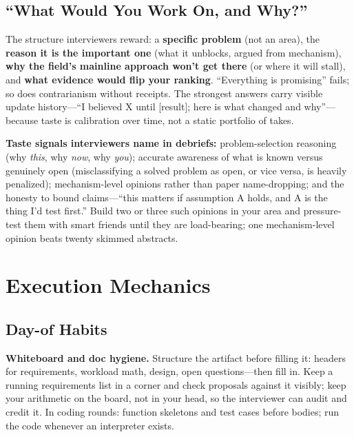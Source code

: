 \subsection{``What Would You Work On, and Why?''}

The structure interviewers reward: a \textbf{specific problem} (not an area), the \textbf{reason it is the important one} (what it unblocks, argued from mechanism), \textbf{why the field's mainline approach won't get there} (or where it will stall), and \textbf{what evidence would flip your ranking}. ``Everything is promising'' fails; so does contrarianism without receipts. The strongest answers carry visible update history---``I believed X until [result]; here is what changed and why''---because taste is calibration over time, not a static portfolio of takes.

\textbf{Taste signals interviewers name in debriefs:} problem-selection reasoning (why \textit{this}, why \textit{now}, why \textit{you}); accurate awareness of what is known versus genuinely open (misclassifying a solved problem as open, or vice versa, is heavily penalized); mechanism-level opinions rather than paper name-dropping; and the honesty to bound claims---``this matters if assumption A holds, and A is the thing I'd test first.'' Build two or three such opinions in your area and pressure-test them with smart friends until they are load-bearing; one mechanism-level opinion beats twenty skimmed abstracts.

\section{Execution Mechanics}
\label{sec:execution_mechanics}

\subsection{Day-of Habits}

\textbf{Whiteboard and doc hygiene.} Structure the artifact before filling it: headers for requirements, workload math, design, open questions---then fill in. Keep a running requirements list in a corner and check proposals against it visibly; keep your arithmetic on the board, not in your head, so the interviewer can audit and credit it. In coding rounds: function skeletons and test cases before bodies; run the code whenever an interpreter exists.

